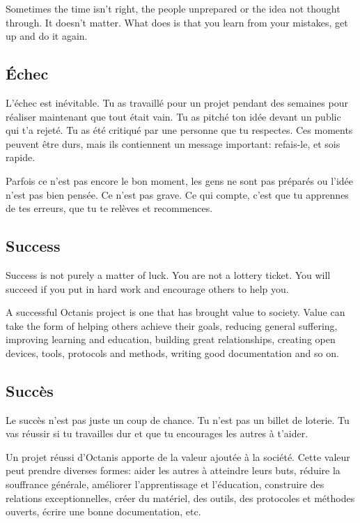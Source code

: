	Sometimes the time isn't right, the people unprepared or the idea not thought through. It doesn't matter. What does is that you learn from your mistakes, get up and do it again. 

	\vspace{0.5cm}


\french
	\subsection{Échec}
	L'échec est inévitable. Tu as travaillé pour un projet pendant des semaines pour réaliser maintenant que tout était vain. Tu as pitché ton idée devant un public qui t'a rejeté. Tu as été critiqué par une personne que tu respectes. 
	Ces moments peuvent être durs, mais ils contiennent un message important: refais-le, et sois rapide.

	Parfois ce n'est pas encore le bon moment, les gens ne sont pas préparés ou l'idée n'est pas bien pensée. Ce n'est pas grave. Ce qui compte, c'est que tu apprennes de tes erreurs, que tu te relèves et recommences. 

\english
	\subsection{Success}
	
	Success is not purely a matter of luck. You are not a lottery ticket. You will succeed if you put in hard work and encourage others to help you. 


	A successful Octanis project is one that has brought value to society. Value can take the form of helping others achieve their goals, reducing general suffering, improving learning and education, building great relationships, creating open devices, tools, protocols and methods, writing good documentation and so on.

	\vspace{0.5cm}

\french
	\subsection{Succès}
	Le succès n'est pas juste un coup de chance. Tu n'est pas un billet de loterie. Tu vas réussir si tu travailles dur et que tu encourages les autres à t'aider. 

	Un projet réussi d'Octanis apporte de la valeur ajoutée à la société. Cette valeur peut prendre diverses formes: aider les autres à atteindre leurs buts, réduire la souffrance générale, améliorer l'apprentissage et l'éducation, construire des relations exceptionnelles, créer du matériel, des outils, des protocoles et méthodes ouverts, écrire une bonne documentation, etc. 


